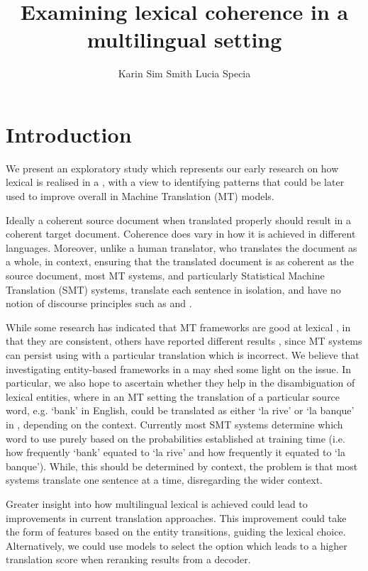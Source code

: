 \documentclass[output=paper]{langsci/langscibook.cls}
\author{Karin Sim Smith \affiliation{The University of Sheffield}\lastand Lucia Specia\affiliation{The University of Sheffield} 
}
\title{Examining lexical coherence in a multilingual setting}
\begin{document}
%	
%
\section{Introduction}\label{intro}

We present an exploratory study which represents our early research on how lexical  is realised in a , with a view to identifying patterns that could be later used to improve overall  in Machine Translation (MT) models. 
 
Ideally a coherent source document when translated properly should result in a coherent target document. Coherence does vary in how it is achieved in different languages. 
Moreover, unlike a human translator, who translates the document as a whole, in context, ensuring that the translated document is as coherent as the source document, most MT systems, and particularly Statistical Machine Translation (SMT) systems, translate each sentence in isolation, and have no notion of discourse principles such as  and .
 
 While some research has indicated that MT frameworks are good at lexical  \citep{CarpuatSimard}, in that they are consistent, others have reported different results \citep{WongKit}, since MT systems can persist using with a particular translation which is incorrect. We believe that investigating entity-based frameworks in a  may shed some light on the issue. 
 In particular, we also hope to ascertain whether they help in the disambiguation of lexical entities, where in an MT setting the translation of a particular source word, e.g. `bank' in English, could be translated as either `la rive' or `la banque' in , depending on the context. Currently most SMT systems determine which word to use purely based on the probabilities established at training time (i.e. how frequently `bank' equated to `la rive' and how frequently it equated to `la banque'). While, this should be determined by context, the problem is that most systems translate one sentence at a time, disregarding the wider context. 
 
 Greater insight into how multilingual lexical  is achieved could lead to improvements in current translation approaches. This improvement could take the form of features based on the entity transitions, guiding the lexical choice. Alternatively, we could use  models to select the option which leads to a higher translation score when reranking results from a decoder.
\end{document}
